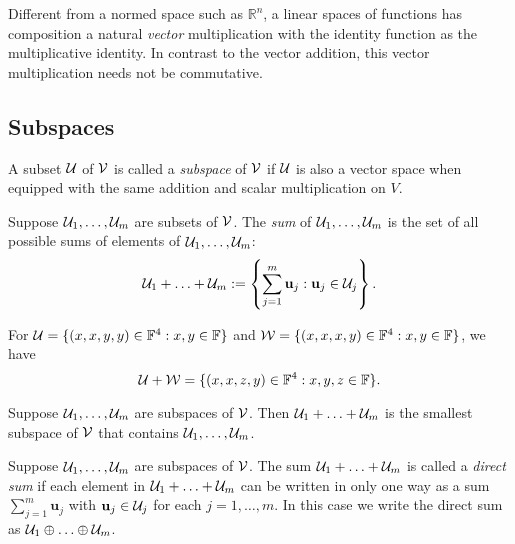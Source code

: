 \begin{rem}
  Different from a normed space such as $\mathbb{R}^n$,
  a linear spaces of functions has 
  composition a natural \emph{vector} multiplication
  with the identity function as the multiplicative identity.
  In contrast to the vector addition,
   this vector multiplication needs not be commutative.
\end{rem}


\subsection{Subspaces}

\begin{defn}
  A subset ${\cal U}$ of ${\cal V}$ is called a \emph{subspace}
  of ${\cal V}$ if ${\cal U}$ is also a vector space
  when equipped with the same addition and scalar multiplication on $V$.
\end{defn}

\begin{defn}
  Suppose ${\cal U}_1, \ldots, {\cal U}_m$ are subsets of ${\cal V}$.
  The \emph{sum} of ${\cal U}_1, \ldots, {\cal U}_m$
  is the set of all possible sums of elements
  of ${\cal U}_1, \ldots, {\cal U}_m$:
  \begin{equation}
    \label{eq:sumOfSubsets}
    {\cal U}_1 + \ldots + {\cal U}_m
    := \left\{
      \sum_{j=1}^m\mathbf{u}_j : \mathbf{u}_j \in {\cal U}_j
      \right\}.
  \end{equation}
\end{defn}

\begin{exm}
  For
  ${\cal U}=\{(x,x,y,y)\in \mathbb{F}^4: x,y\in \mathbb{F}\}$
  and 
  ${\cal W}=\{(x,x,x,y)\in \mathbb{F}^4: x,y\in \mathbb{F}\}$,
  we have
  \begin{displaymath}
    {\cal U}+{\cal W}=\{(x,x,z,y)\in \mathbb{F}^4: x,y,z\in \mathbb{F}\}.
  \end{displaymath}
\end{exm}

\begin{lem}
  Suppose ${\cal U}_1, \ldots, {\cal U}_m$ are subspaces of ${\cal V}$.
  Then ${\cal U}_1 + \ldots + {\cal U}_m$ is the smallest
  subspace of ${\cal V}$ that contains
  ${\cal U}_1, \ldots, {\cal U}_m$.
\end{lem}

\begin{defn}
  \label{def:directSum}
  Suppose ${\cal U}_1, \ldots, {\cal U}_m$ are subspaces of ${\cal V}$.
  The sum ${\cal U}_1 + \ldots + {\cal U}_m$
  is called a \emph{direct sum}
  if each element in ${\cal U}_1 + \ldots + {\cal U}_m$
  can be written in only one way as a sum
  $\sum_{j=1}^m\mathbf{u}_j$ with $\mathbf{u}_j \in {\cal U}_j$
  for each $j=1, \ldots, m$.
  In this case we write the direct sum as
  ${\cal U}_1 \oplus \ldots \oplus {\cal U}_m$.
\end{defn}

